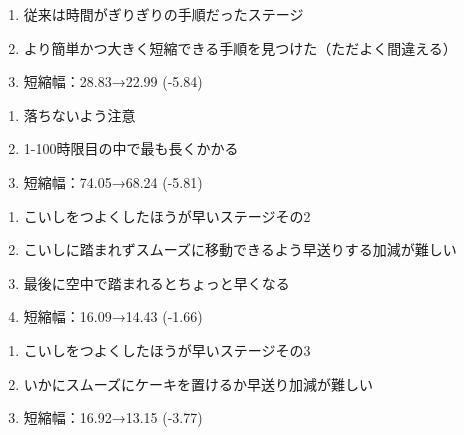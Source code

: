 \begin{enumerate}[label={\sarrow}]
\item 従来は時間がぎりぎりの手順だったステージ
\item より簡単かつ大きく短縮できる手順を見つけた（ただよく間違える）
\item 短縮幅：28.83→22.99 (-5.84)
\end{enumerate}



\begin{enumerate}[label={\sarrow}]
\item 落ちないよう注意
\item 1-100時限目の中で最も長くかかる
\item 短縮幅：74.05→68.24 (-5.81)
\end{enumerate}



\begin{enumerate}[label={\sarrow}]
\item こいしをつよくしたほうが早いステージその2
\item こいしに踏まれずスムーズに移動できるよう早送りする加減が難しい
\item 最後に空中で踏まれるとちょっと早くなる
\item 短縮幅：16.09→14.43 (-1.66)
\end{enumerate}



\begin{enumerate}[label={\sarrow}]
\item こいしをつよくしたほうが早いステージその3
\item いかにスムーズにケーキを置けるか早送り加減が難しい
\item 短縮幅：16.92→13.15 (-3.77)
\end{enumerate}





